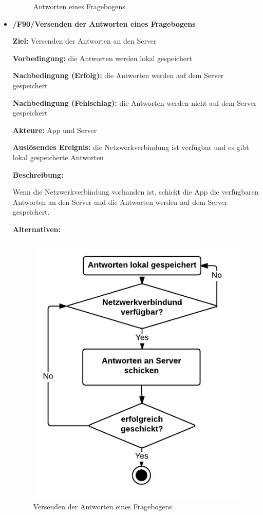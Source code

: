 \documentclass[a4paper]{scrreprt}
\begin{document}
\begin{itemize}
\begin{figure}[ht]
            		\caption{Antworten eines Fragebogens}
            	\end{figure}
            	

            \item \textbf{/F90/Versenden der Antworten eines Fragebogens}

            \par \textbf{Ziel: }Versenden der Antworten an den Server
            \par \textbf{Vorbedingung: }die Antworten werden lokal gespeichert
            \par \textbf{Nachbedingung (Erfolg): }die Antworten werden auf dem Server gespeichert
            \par \textbf{Nachbedingung (Fehlschlag): }die Antworten werden nicht auf dem Server gespeichert
            \par \textbf{Akteure: }App und Server
            \par \textbf{Auslösendes Ereignis: }die Netzwerkverbindung ist verfügbar und es gibt lokal gespeicherte Antworten
            \par \textbf{Beschreibung: }
            \par Wenn die Netzwerkverbindung vorhanden ist, schickt die App die verfügbaren Antworten an den Server und die Antworten werden auf dem Server gespeichert.
            \par \textbf{Alternativen: }
            \begin{figure}[ht]
            	\centering
            	\includegraphics[scale=1.2]{AppVersenden.jpeg}
            	\caption{Versenden der Antworten eines Fragebogens}
            \end{figure}



\end{itemize}
\end{document}
